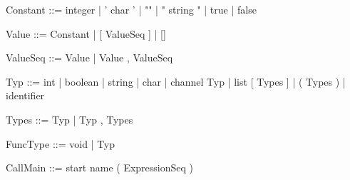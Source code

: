 \documentclass[11pt]{report}
\begin{document}
\begin{verbnobox}[\normalfont]
Constant ::= integer
             | ' char '
             | ""
             | " string "
             | true
             | false
\end{verbnobox}
\vspace*{3pt}

\begin{verbnobox}[\normalfont]
Value ::= Constant | [ ValueSeq ] | []
\end{verbnobox}
\vspace*{3pt}

\begin{verbnobox}[\normalfont]
ValueSeq ::= Value | Value , ValueSeq
\end{verbnobox}
\vspace*{3pt}

\begin{verbnobox}[\normalfont]
Typ ::= int
      | boolean
      | string
      | char
      | channel Typ
      | list [ Types ]
      | ( Types )
      | identifier
\end{verbnobox}
\vspace*{3pt}

\begin{verbnobox}[\normalfont]
Types ::= Typ | Typ , Types
\end{verbnobox}
\vspace*{3pt}

\begin{verbnobox}[\normalfont]
FuncType ::= void | Typ
\end{verbnobox}
\vspace*{3pt}

\begin{verbnobox}[\normalfont]
CallMain ::= start name ( ExpressionSeq )
\end{verbnobox}
\vspace*{3pt}
\end{document}
